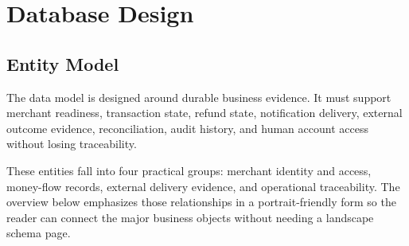 \chapter{Database Design}

\section{Entity Model}

The data model is designed around durable business evidence. It must support
merchant readiness, transaction state, refund state, notification delivery,
external outcome evidence, reconciliation, audit history, and human account
access without losing traceability.

These entities fall into four practical groups: merchant identity and access,
money-flow records, external delivery evidence, and operational traceability.
The overview below emphasizes those relationships in a portrait-friendly form so
the reader can connect the major business objects without needing a landscape
schema page.

